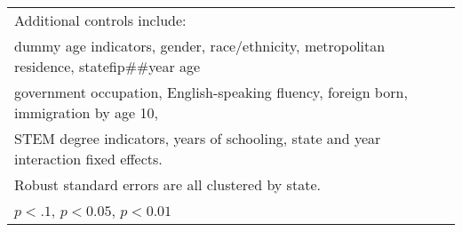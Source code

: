 \begin{table}[htbp]
\begin{tabular}{l*{3}{c}}
\bottomrule
\multicolumn{4}{l}{\footnotesize Additional controls include:}\\
\multicolumn{4}{l}{\footnotesize dummy age indicators, gender, race/ethnicity, metropolitan residence, statefip##year age}\\
\multicolumn{4}{l}{\footnotesize government occupation, English-speaking fluency, foreign born, immigration by age 10,}\\
\multicolumn{4}{l}{\footnotesize STEM degree indicators, years of schooling, state and year interaction fixed effects.}\\
\multicolumn{4}{l}{\footnotesize Robust standard errors are all clustered by state.}\\
\multicolumn{4}{l}{\footnotesize \sym{*} \(p<.1\), \sym{**} \(p<0.05\), \sym{***} \(p<0.01\)}\\
\end{tabular}
\end{table}
